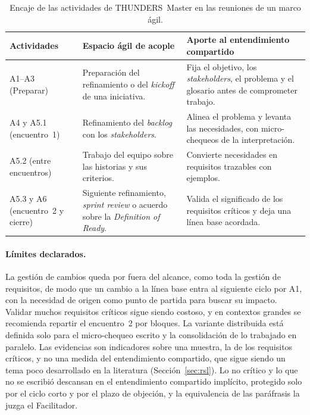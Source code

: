 \documentclass[12pt,letterpaper,oneside]{report}
\begin{document}
\begin{table}[H]
\caption{Encaje de las actividades de THUNDERS~Master en las reuniones de un marco ágil.}
\label{tab:agile_fit}
\centering
\footnotesize
\renewcommand{\arraystretch}{1.15}
\begin{tabularx}{\textwidth}{@{}L{3.6cm}L{4.4cm}Y@{}}
\toprule
\textbf{Actividades} & \textbf{Espacio ágil de acople} & \textbf{Aporte al
entendimiento compartido} \\
\midrule
A1--A3 (Preparar) & Preparación del refinamiento o del \textit{kickoff} de una iniciativa. & Fija el objetivo, los
\textit{stakeholders}, el problema y el glosario antes de comprometer trabajo.
\\
A4 y A5.1 (encuentro~1) & Refinamiento del \textit{backlog} con los
\textit{stakeholders}. & Alinea el problema y levanta las necesidades, con micro-chequeos de la interpretación. \\
A5.2 (entre encuentros) & Trabajo del equipo sobre las historias y sus
criterios. & Convierte necesidades en requisitos trazables con ejemplos. \\
A5.3 y A6 (encuentro~2 y cierre) & Siguiente refinamiento, \textit{sprint
review} o acuerdo sobre la \textit{Definition of Ready}. & Valida el significado de los requisitos críticos y deja una línea base acordada. \\
\bottomrule
\end{tabularx}
\end{table}

\paragraph{Límites declarados.}
\label{sec:limites_final}
La gestión de cambios queda
por fuera del alcance, como toda la gestión de requisitos, de modo que un cambio
a la línea base entra al siguiente ciclo por A1, con la necesidad de origen como
punto de partida para buscar su impacto. Validar muchos requisitos críticos
sigue siendo costoso, y en contextos grandes se recomienda repartir el
encuentro~2 por bloques. La variante distribuida está definida solo
para el micro-chequeo escrito y la consolidación de lo trabajado en paralelo.
Las evidencias son indicadores sobre una muestra, la de los requisitos críticos, y no una medida del entendimiento compartido, que sigue siendo un tema poco desarrollado
en la literatura (Sección~\ref{sec:rsl}). Lo no crítico y lo que no se escribió
descansan en el entendimiento compartido implícito, protegido solo por el ciclo corto y por
el plazo de objeción, y la equivalencia de las paráfrasis la juzga el
Facilitador.
\end{document}
